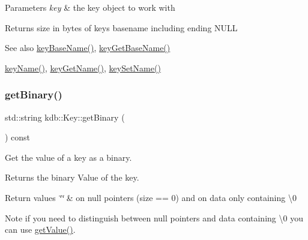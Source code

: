 \begin{DoxyParams}{Parameters}
{\em key} & the key object to work with \\
\hline
\end{DoxyParams}
\begin{DoxyReturn}{Returns}
size in bytes of {\ttfamily key\textquotesingle{}s} basename including ending N\+U\+LL 
\end{DoxyReturn}
\begin{DoxySeeAlso}{See also}
\hyperlink{group__keyname_gaaff35e7ca8af5560c47e662ceb9465f5}{key\+Base\+Name()}, \hyperlink{group__keyname_ga0992d26bcfca767cb8e77053a483eb64}{key\+Get\+Base\+Name()} 

\hyperlink{group__keyname_ga8e805c726a60da921d3736cda7813513}{key\+Name()}, \hyperlink{group__keyname_gab29a850168d9b31c9529e90cf9ab68be}{key\+Get\+Name()}, \hyperlink{group__keyname_ga7699091610e7f3f43d2949514a4b35d9}{key\+Set\+Name()} 
\end{DoxySeeAlso}
\mbox{\label{classkdb_1_1Key_ada114aba31b321ddc984018b43a8568b}} 
\subsubsection{\texorpdfstring{get\+Binary()}{getBinary()}}
{\footnotesize\ttfamily std\+::string kdb\+::\+Key\+::get\+Binary (\begin{DoxyParamCaption}{ }\end{DoxyParamCaption}) const\hspace{0.3cm}{\ttfamily [inline]}}



Get the value of a key as a binary. 

\begin{DoxyReturn}{Returns}
the binary Value of the key.
\end{DoxyReturn}

\begin{DoxyRetVals}{Return values}
{\em \char`\"{}\char`\"{}} & on null pointers (size == 0) and on data only containing \textbackslash{}0\\
\hline
\end{DoxyRetVals}
\begin{DoxyNote}{Note}
if you need to distinguish between null pointers and data containing \textbackslash{}0 you can use \hyperlink{classkdb_1_1Key_a444c6f254536196a7031288e9f4c3088}{get\+Value()}.
\end{DoxyNote}

